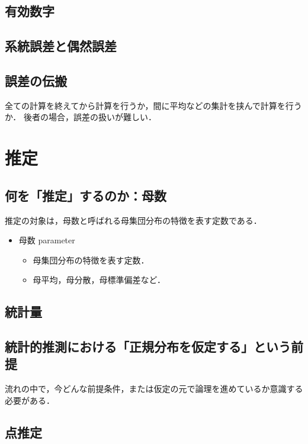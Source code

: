 \section{有効数字}
\section{系統誤差と偶然誤差}
\section{誤差の伝搬}

全ての計算を終えてから計算を行うか，間に平均などの集計を挟んで計算を行うか．
後者の場合，誤差の扱いが難しい．


\chapter{推定}

\section{何を「推定」するのか：母数}

推定の対象は，母数と呼ばれる母集団分布の特徴を表す定数である．

\begin{itemize}
  \item 母数 parameter
        \begin{itemize}
          \item 母集団分布の特徴を表す定数．
          \item 母平均，母分散，母標準偏差など．
        \end{itemize}
\end{itemize}



\section{統計量}
\section{統計的推測における「正規分布を仮定する」という前提}

流れの中で，今どんな前提条件，または仮定の元で論理を進めているか意識する必要がある．

\section{点推定}

